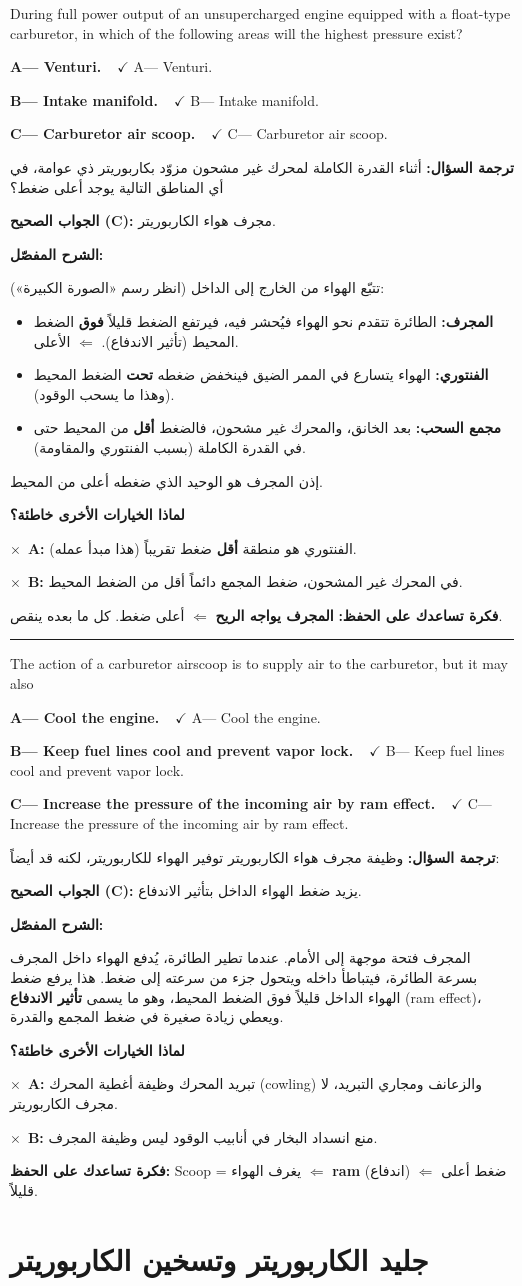 \documentclass[11pt,a4paper]{article}
\newcommand{\en}[1]{\textenglish{#1}}
\newcommand{\correctletter}{}
\newcommand{\opt}[2]{%
  \ifdefstring{\correctletter}{#1}%
    {\textcolor{ansgreen}{\textbf{#1— #2\ \ $\checkmark$}}}%
    {#1— #2}\par}
\newcommand{\Q}[6]{%
  \renewcommand{\correctletter}{#6}%
  \par\bigskip
  \phantomsection\label{q#1}%
  \begin{tcolorbox}[enhanced,breakable,colback=qback,colframe=qframe,
      arc=2mm,boxrule=0.8pt,fonttitle=\bfseries,
      title={\en{Question #1}}]
    \begin{english}
      #2\par\smallskip
      \opt{A}{#3}\opt{B}{#4}\opt{C}{#5}
    \end{english}
  \end{tcolorbox}}
\newcommand{\tr}[1]{\textbf{\textcolor{qframe}{ترجمة السؤال:}} #1\par}
\newcommand{\ans}[2]{%
  \begin{tcolorbox}[colback=ansback,colframe=ansgreen,boxrule=0.6pt,arc=1.5mm,
      left=4pt,right=4pt,top=2pt,bottom=2pt]
    \textbf{\textcolor{ansgreen}{الجواب الصحيح (\en{#1}):}} #2
  \end{tcolorbox}}
\newcommand{\sharh}[1]{\textbf{\textcolor{conceptc}{الشرح المفصّل:}}\par #1\par}
\newcommand{\nohead}{\textbf{\textcolor{wrongc}{لماذا الخيارات الأخرى خاطئة؟}}\par}
\newcommand{\no}[2]{\hspace*{1em}\textcolor{wrongc}{$\times$}\ \textbf{\en{#1}:} #2\par}
\newcommand{\tip}[1]{%
  \begin{tcolorbox}[colback=tipback,colframe=tipframe,boxrule=0.5pt,arc=1.5mm,
      left=4pt,right=4pt,top=2pt,bottom=2pt]
    \textbf{فكرة تساعدك على الحفظ:} #1
  \end{tcolorbox}}
\newcommand{\qsep}{\par\medskip\noindent\textcolor{qframe!40}{\rule{\linewidth}{0.4pt}}\par}
\begin{document}
\Q{8780}{During full power output of an unsupercharged engine equipped with a float-type carburetor, in which of the following areas will the highest pressure exist?}
{Venturi.}
{Intake manifold.}
{Carburetor air scoop.}{C}
\tr{أثناء القدرة الكاملة لمحرك غير مشحون مزوّد بكاربوريتر ذي عوامة، في أي المناطق التالية يوجد أعلى ضغط؟}
\ans{C}{مجرف هواء الكاربوريتر.}
\sharh{تتبّع الهواء من الخارج إلى الداخل (انظر رسم «الصورة الكبيرة»):
\begin{itemize}
  \item \textbf{المجرف:} الطائرة تتقدم نحو الهواء فيُحشر فيه، فيرتفع الضغط قليلاً \textbf{فوق} الضغط المحيط (تأثير الاندفاع). $\Leftarrow$ الأعلى.
  \item \textbf{الفنتوري:} الهواء يتسارع في الممر الضيق فينخفض ضغطه \textbf{تحت} الضغط المحيط (وهذا ما يسحب الوقود).
  \item \textbf{مجمع السحب:} بعد الخانق، والمحرك غير مشحون، فالضغط \textbf{أقل} من المحيط حتى في القدرة الكاملة (بسبب الفنتوري والمقاومة).
\end{itemize}
إذن المجرف هو الوحيد الذي ضغطه أعلى من المحيط.}
\nohead
\no{A}{الفنتوري هو منطقة \textbf{أقل} ضغط تقريباً (هذا مبدأ عمله).}
\no{B}{في المحرك غير المشحون، ضغط المجمع دائماً أقل من الضغط المحيط.}
\tip{\textbf{المجرف يواجه الريح} $\Leftarrow$ أعلى ضغط. كل ما بعده ينقص.}
\qsep

\Q{8812}{The action of a carburetor airscoop is to supply air to the carburetor, but it may also}
{Cool the engine.}
{Keep fuel lines cool and prevent vapor lock.}
{Increase the pressure of the incoming air by ram effect.}{C}
\tr{وظيفة مجرف هواء الكاربوريتر توفير الهواء للكاربوريتر، لكنه قد أيضاً:}
\ans{C}{يزيد ضغط الهواء الداخل بتأثير الاندفاع.}
\sharh{المجرف فتحة موجهة إلى الأمام. عندما تطير الطائرة، يُدفع الهواء داخل المجرف بسرعة الطائرة، فيتباطأ داخله ويتحول جزء من سرعته إلى ضغط. هذا يرفع ضغط الهواء الداخل قليلاً فوق الضغط المحيط، وهو ما يسمى \textbf{تأثير الاندفاع} (\en{ram effect})، ويعطي زيادة صغيرة في ضغط المجمع والقدرة.}
\nohead
\no{A}{تبريد المحرك وظيفة أغطية المحرك (\en{cowling}) والزعانف ومجاري التبريد، لا مجرف الكاربوريتر.}
\no{B}{منع انسداد البخار في أنابيب الوقود ليس وظيفة المجرف.}
\tip{\en{Scoop} = يغرف الهواء $\Leftarrow$ \en{\textbf{ram}} (اندفاع) $\Leftarrow$ ضغط أعلى قليلاً.}

\newpage
\section{جليد الكاربوريتر وتسخين الكاربوريتر}
\end{document}
